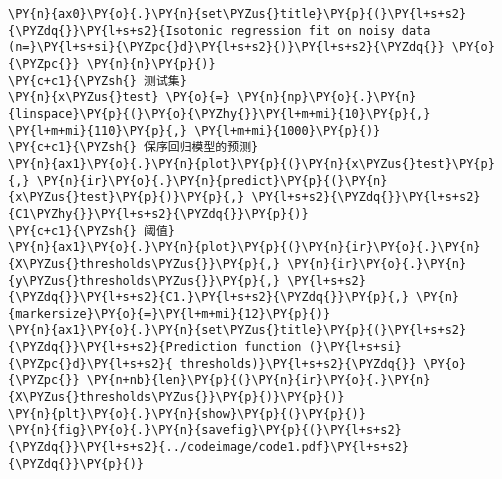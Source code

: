 \begin{Verbatim}[commandchars=\\\{\}]
\PY{n}{ax0}\PY{o}{.}\PY{n}{set\PYZus{}title}\PY{p}{(}\PY{l+s+s2}{\PYZdq{}}\PY{l+s+s2}{Isotonic regression fit on noisy data (n=}\PY{l+s+si}{\PYZpc{}d}\PY{l+s+s2}{)}\PY{l+s+s2}{\PYZdq{}} \PY{o}{\PYZpc{}} \PY{n}{n}\PY{p}{)}
\PY{c+c1}{\PYZsh{} 测试集}
\PY{n}{x\PYZus{}test} \PY{o}{=} \PY{n}{np}\PY{o}{.}\PY{n}{linspace}\PY{p}{(}\PY{o}{\PYZhy{}}\PY{l+m+mi}{10}\PY{p}{,} \PY{l+m+mi}{110}\PY{p}{,} \PY{l+m+mi}{1000}\PY{p}{)}
\PY{c+c1}{\PYZsh{} 保序回归模型的预测}
\PY{n}{ax1}\PY{o}{.}\PY{n}{plot}\PY{p}{(}\PY{n}{x\PYZus{}test}\PY{p}{,} \PY{n}{ir}\PY{o}{.}\PY{n}{predict}\PY{p}{(}\PY{n}{x\PYZus{}test}\PY{p}{)}\PY{p}{,} \PY{l+s+s2}{\PYZdq{}}\PY{l+s+s2}{C1\PYZhy{}}\PY{l+s+s2}{\PYZdq{}}\PY{p}{)}
\PY{c+c1}{\PYZsh{} 阈值}
\PY{n}{ax1}\PY{o}{.}\PY{n}{plot}\PY{p}{(}\PY{n}{ir}\PY{o}{.}\PY{n}{X\PYZus{}thresholds\PYZus{}}\PY{p}{,} \PY{n}{ir}\PY{o}{.}\PY{n}{y\PYZus{}thresholds\PYZus{}}\PY{p}{,} \PY{l+s+s2}{\PYZdq{}}\PY{l+s+s2}{C1.}\PY{l+s+s2}{\PYZdq{}}\PY{p}{,} \PY{n}{markersize}\PY{o}{=}\PY{l+m+mi}{12}\PY{p}{)}
\PY{n}{ax1}\PY{o}{.}\PY{n}{set\PYZus{}title}\PY{p}{(}\PY{l+s+s2}{\PYZdq{}}\PY{l+s+s2}{Prediction function (}\PY{l+s+si}{\PYZpc{}d}\PY{l+s+s2}{ thresholds)}\PY{l+s+s2}{\PYZdq{}} \PY{o}{\PYZpc{}} \PY{n+nb}{len}\PY{p}{(}\PY{n}{ir}\PY{o}{.}\PY{n}{X\PYZus{}thresholds\PYZus{}}\PY{p}{)}\PY{p}{)}
\PY{n}{plt}\PY{o}{.}\PY{n}{show}\PY{p}{(}\PY{p}{)}
\PY{n}{fig}\PY{o}{.}\PY{n}{savefig}\PY{p}{(}\PY{l+s+s2}{\PYZdq{}}\PY{l+s+s2}{../codeimage/code1.pdf}\PY{l+s+s2}{\PYZdq{}}\PY{p}{)}
\end{Verbatim}
